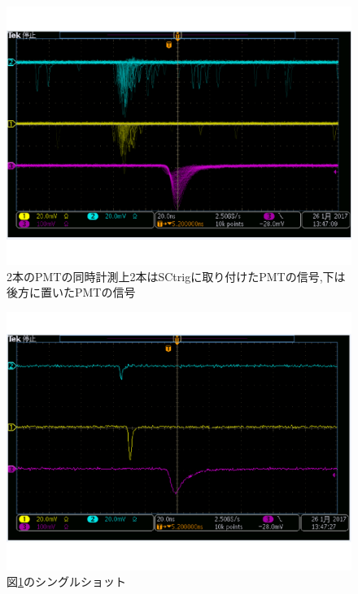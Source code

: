 \begin{figure}[tbp]

\centering
\includegraphics[keepaspectratio,scale=0.3]{fig/ybm/oscillo.pdf}
	\caption[2本のPMTの同時計測]{2本のPMTの同時計測\newline 上2本はSCtrigに取り付けたPMTの信号,下は後方に置いたPMTの信号}
\label{fig:oscillo}
\end{figure}
\begin{figure}[tbp]
\centering
\includegraphics[keepaspectratio,scale=0.3]{fig/ybm/oscillo1.pdf}
\caption{図\ref{fig:oscillo}のシングルショット}
\label{fig:oscillo1}
\end{figure}

